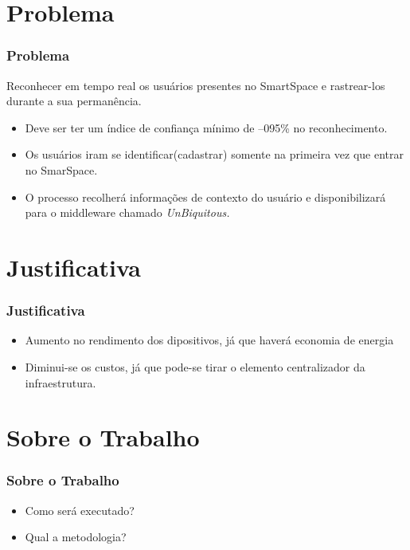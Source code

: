 \documentclass{beamer}
\begin{document}
\section{Problema}
\begin{frame}
    \frametitle{Problema}
    Reconhecer em tempo real os usuários presentes no SmartSpace e rastrear-los durante a sua permanência. \\
	\begin{itemize}
      		\pause \item Deve ser ter um índice de confiança mínimo de --095\% no reconhecimento. \\
		\pause \item Os usuários iram se identificar(cadastrar) somente na primeira vez que entrar no SmarSpace. \\
    		\pause \item O processo recolherá informações de contexto do usuário e disponibilizará para o middleware chamado \it{UnBiquitous}.
	\end{itemize}
\end{frame}

\section{Justificativa} 
\begin{frame}
    \frametitle{Justificativa}
    \begin{itemize}
      \item Aumento no rendimento dos dipositivos, já que haverá economia de
      energia
      \item Diminui-se os custos, já que pode-se tirar o elemento centralizador
      da infraestrutura.
    \end{itemize}
\end{frame}


\section{Sobre o Trabalho}
\begin{frame}
    \frametitle{Sobre o Trabalho}
    \begin{itemize}
        \item Como será executado?
        \item Qual a metodologia?
    \end{itemize}
\end{frame}
\end{document}

